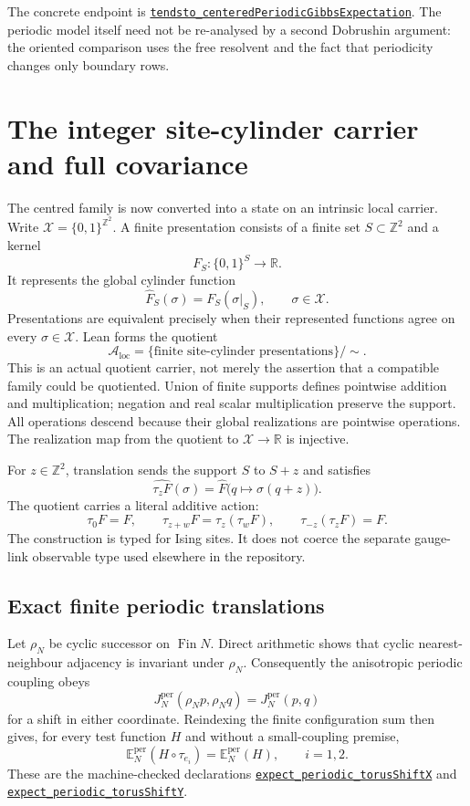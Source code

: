 \documentclass[11pt]{article}
\theoremstyle{definition}
\newcommand{\R}{\mathbb R}
\newcommand{\Z}{\mathbb Z}
\newcommand{\E}{\mathbb E}
\newcommand{\sourceanchor}{f587b35001f4ae87c7fe0383662864df6bc9a1c0}
\newcommand{\leanline}[3]{%
  \href{https://github.com/lluiseriksson/THE-ERIKSSON-PROGRAMME/blob/\sourceanchor/YangMills/OS/#1.lean\#L#2}{\nolinkurl{#3}}}
\begin{document}
The concrete endpoint is
\leanline{DobrushinInfiniteState}{468}{tendsto_centeredPeriodicGibbsExpectation}.
The periodic model itself need not be re-analysed by a second Dobrushin
argument: the oriented comparison uses the free resolvent and the fact that
periodicity changes only boundary rows.

\section{The integer site-cylinder carrier and full covariance}
\label{sec:covariance}

The centred family is now converted into a state on an intrinsic local
carrier.  Write $\mathcal X=\{0,1\}^{\Z^2}$.  A finite presentation consists
of a finite set $S\subset\Z^2$ and a kernel
\[
  F_S:\{0,1\}^{S}\longrightarrow\R.
\]
It represents the global cylinder function
\[
  \widehat F_S(\sigma)=F_S(\sigma|_S),\qquad \sigma\in\mathcal X.
\]
Presentations are equivalent precisely when their represented functions agree
on every $\sigma\in\mathcal X$.  Lean forms the quotient
\[
  \mathcal A_{\mathrm{loc}}
   =\{\text{finite site-cylinder presentations}\}/\!\sim .
\]
This is an actual quotient carrier, not merely the assertion that a compatible
family could be quotiented.  Union of finite supports defines pointwise
addition and multiplication; negation and real scalar multiplication preserve
the support.  All operations descend because their global realizations are
pointwise operations.  The realization map from the quotient to
$\mathcal X\to\R$ is injective.

For $z\in\Z^2$, translation sends the support $S$ to $S+z$ and satisfies
\[
  \widehat{\tau_z F}(\sigma)
   =\widehat F\bigl(q\mapsto\sigma(q+z)\bigr).
\]
The quotient carries a literal additive action:
\[
  \tau_0F=F,\qquad
  \tau_{z+w}F=\tau_z(\tau_wF),\qquad
  \tau_{-z}(\tau_zF)=F.
\]
The construction is typed for Ising sites.  It does not coerce the separate
gauge-link observable type used elsewhere in the repository.

\subsection{Exact finite periodic translations}

Let $\rho_N$ be cyclic successor on $\operatorname{Fin}N$.  Direct arithmetic
shows that cyclic nearest-neighbour adjacency is invariant under $\rho_N$.
Consequently the anisotropic periodic coupling obeys
\[
  J_N^{\mathrm{per}}(\rho_Np,\rho_Nq)
   =J_N^{\mathrm{per}}(p,q)
\]
for a shift in either coordinate.  Reindexing the finite configuration sum
then gives, for every test function $H$ and without a small-coupling premise,
\[
  \E_N^{\mathrm{per}}(H\circ\tau_{e_i})
   =\E_N^{\mathrm{per}}(H),\qquad i=1,2.
\]
These are the machine-checked declarations
\leanline{DobrushinPeriodicTranslation}{200}{expect_periodic_torusShiftX}
and
\leanline{DobrushinPeriodicTranslation}{222}{expect_periodic_torusShiftY}.
\end{document}
